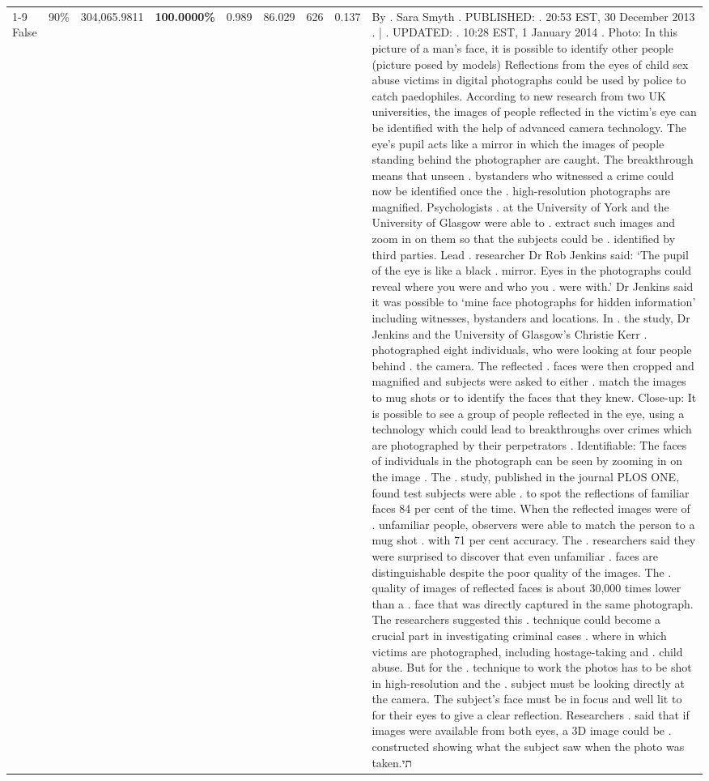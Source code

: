\begin{table}[H]
\begin{tabular}{lllrlllll}
\cline{1-9} \cline{2-9}
False & 90\% & 304,065.9811 & \bfseries \color{red} 100.0000\% & 0.989 & 86.029 & 626 & 0.137 & By . Sara Smyth . PUBLISHED: . 20:53 EST, 30 December 2013 . | . UPDATED: . 10:28 EST, 1 January 2014 . Photo: In this picture of a man's face, it is possible to identify other people (picture posed by models) Reflections from the eyes of child sex abuse victims in digital photographs could be used by police to catch paedophiles. According to new research from two UK universities, the images of people reflected in the victim's eye can be identified with the help of advanced camera technology. The eye's pupil acts like a mirror in which the images of people standing behind the photographer are caught. The breakthrough means that unseen . bystanders who witnessed a crime could now be identified once the . high-resolution photographs are magnified. Psychologists . at the University of York and the University of Glasgow were able to . extract such images and zoom in on them so that the subjects could be . identified by third parties. Lead . researcher Dr Rob Jenkins said: ‘The pupil of the eye is like a black . mirror. Eyes in the photographs could reveal where you were and who you . were with.' Dr Jenkins said it was possible to ‘mine face photographs for hidden information' including witnesses, bystanders and locations. In . the study, Dr Jenkins and the University of Glasgow's Christie Kerr . photographed eight individuals, who were looking at four people behind . the camera. The reflected . faces were then cropped and magnified and subjects were asked to either . match the images to mug shots or to identify the faces that they knew. Close-up: It is possible to see a group of people reflected in the eye, using a technology which could lead to breakthroughs over crimes which are photographed by their perpetrators . Identifiable: The faces of individuals in the photograph can be seen by zooming in on the image . The . study, published in the journal PLOS ONE, found test subjects were able . to spot the reflections of familiar faces 84 per cent of the time. When the reflected images were of . unfamiliar people, observers were able to match the person to a mug shot . with 71 per cent accuracy. The . researchers said they were surprised to discover that even unfamiliar . faces are distinguishable despite the poor quality of the images. The . quality of images of reflected faces is about 30,000 times lower than a . face that was directly captured in the same photograph. The researchers suggested this . technique could become a crucial part in investigating criminal cases . where in which victims are photographed, including hostage-taking and . child abuse. But for the . technique to work the photos has to be shot in high-resolution and the . subject must be looking directly at the camera. The subject's face must be in focus and well lit to for their eyes to give a clear reflection. Researchers . said that if images were available from both eyes, a 3D image could be . constructed showing what the subject saw when the photo was taken.תי \\

\end{tabular}
\end{table}
